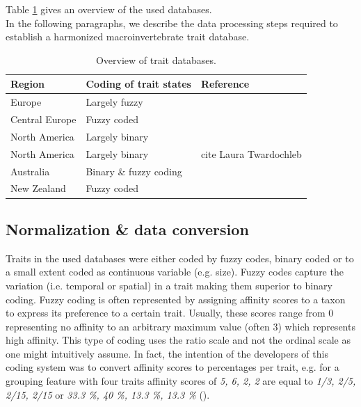 \documentclass{article}
\begin{document}
Table \ref{tab:trait_databases} gives an overview of the used databases. \\ 
In the following paragraphs, we describe the data processing steps required to 
establish a harmonized macroinvertebrate trait database. 

\begin{table}[H]
    \centering
    \caption{Overview of trait databases.}
    \label{tab:trait_databases}
    \begin{tabular}{lll}
    \toprule
   Region & Coding of trait states & Reference \\ 
    \hline
   Europe & Largely fuzzy & \cite{schmidt-kloiber_www.freshwaterecology.info_2015}\\ 
   Central Europe & Fuzzy coded & \cite{usseglio-polatera_biomonitoring_2000} \\ 
   North America & Largely binary & \cite{vieira_database_nodate}\\
   North America & Largely binary & cite Laura Twardochleb \\
   Australia & Binary \& fuzzy coding  & \cite{kefford_ben_AST_DB_2019}\\ 
   New Zealand & Fuzzy coded & \\ %
    \bottomrule
    \end{tabular}
\end{table}


\subsection{Normalization \& data conversion}

Traits in the used databases were either coded by fuzzy codes, binary coded or 
to a small extent coded as continuous variable (e.g. size). 
Fuzzy codes capture the variation (i.e. temporal or spatial) in a trait making them 
superior to binary coding. Fuzzy coding is often represented by assigning affinity 
scores to a taxon to express its preference to a certain trait. Usually, these 
scores range from 0 representing no affinity to an arbitrary maximum value (often 3) 
which represents high affinity. This type of coding uses the ratio scale
and not the ordinal scale as one might intuitively assume. In fact, the intention of the 
developers of this coding system was to convert affinity scores to percentages 
per trait, e.g. for a grouping feature with four traits affinity scores of 
\textit{5, 6, 2, 2} are equal to \textit{1/3, 2/5, 2/15, 2/15} or 
\textit{33.3 \%, 40 \%, 13.3 \%, 13.3 \%} (\cite{chevenet_francois_fuzzy_1994}).
\end{document}
